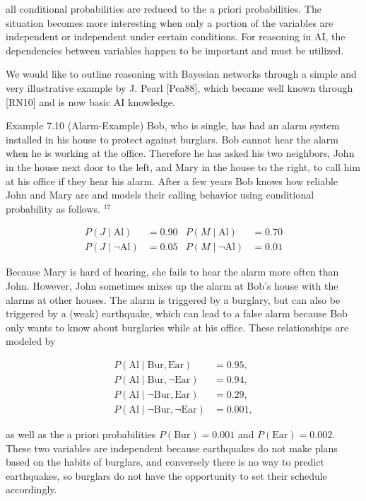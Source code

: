 \documentclass[10pt]{book}
\begin{document}
all conditional probabilities are reduced to the a priori probabilities. The situation becomes more interesting when only a portion of the variables are independent or independent under certain conditions. For reasoning in AI, the dependencies between variables happen to be important and must be utilized.

We would like to outline reasoning with Bayesian networks through a simple and very illustrative example by J. Pearl [Pea88], which became well known through [RN10] and is now basic AI knowledge.

Example 7.10 (Alarm-Example) Bob, who is single, has had an alarm system installed in his house to protect against burglars. Bob cannot hear the alarm when he is working at the office. Therefore he has asked his two neighbors, John in the house next door to the left, and Mary in the house to the right, to call him at his office if they hear his alarm. After a few years Bob knows how reliable John and Mary are and models their calling behavior using conditional probability as follows. ${ }^{17}$

\[
\begin{array}{rlrl}
P(J \mid \text{Al}) &= 0.90 & P(M \mid \text{Al}) &= 0.70 \\
P(J \mid \neg \text{Al}) &= 0.05 & P(M \mid \neg \text{Al}) &= 0.01
\end{array}
\]

Because Mary is hard of hearing, she fails to hear the alarm more often than John. However, John sometimes mixes up the alarm at Bob's house with the alarms at other houses. The alarm is triggered by a burglary, but can also be triggered by a (weak) earthquake, which can lead to a false alarm because Bob only wants to know about burglaries while at his office. These relationships are modeled by

\[
\begin{aligned}
P(\text{Al} \mid \text{Bur}, \text{Ear}) &= 0.95, \\
P(\text{Al} \mid \text{Bur}, \neg \text{Ear}) &= 0.94, \\
P(\text{Al} \mid \neg \text{Bur}, \text{Ear}) &= 0.29, \\
P(\text{Al} \mid \neg \text{Bur}, \neg \text{Ear}) &= 0.001,
\end{aligned}
\]

as well as the a priori probabilities $P(\text{Bur})=0.001$ and $P(\text{Ear})=0.002$. These two variables are independent because earthquakes do not make plans based on the habits of burglars, and conversely there is no way to predict earthquakes, so burglars do not have the opportunity to set their schedule accordingly.
\end{document}
